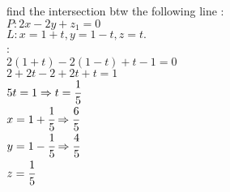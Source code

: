 \begin{example}
 find the intersection btw the following line :\\
$P:2x-2y+z_1 = 0 $\\
$L: x=1+t , y=1-t , z=t .$\\
{{}}:\\ 
 $2(1+t) -2(1-t) +t-1 = 0$\\
$2+2t-2+2t+t=1$\\
$5t = 1\Rightarrow t=\cfrac{1}{5}$\\
$x=1+\cfrac{1}{5} \Rightarrow \cfrac{6}{5}$\\
$y=1-\cfrac{1}{5} \Rightarrow \cfrac{4}{5}$\\
$z=\cfrac{1}{5}$
\end{example}
\noindent{\color{smalt(darkpowderblue)}\rule{\linewidth}{.2mm}}